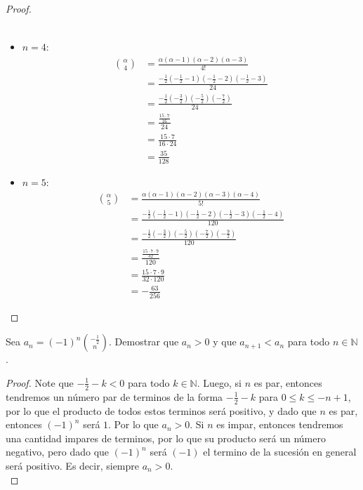 \documentclass[../main.tex]{subfiles}
\begin{document}
\begin{partes}
\begin{proof}
\begin{itemize}
\begin{align*}
            \end{align*}
            \item $n = 4$:
            \begin{align*}
                \binom{\alpha}{4} &= \frac{\alpha (\alpha-1)(\alpha-2)(\alpha-3)}{4!}\\
                &= \frac{-\frac{1}{2} \left(-\frac{1}{2}-1\right) \left(-\frac{1}{2}-2\right) \left(-\frac{1}{2}-3\right)}{24}\\
                &= \frac{-\frac{1}{2} \left(-\frac{3}{2}\right)\left(-\frac{5}{2}\right) \left(-\frac{7}{2}\right)}{24}\\
                &= \frac{\frac{15 \cdot 7}{16}}{24}\\
                &= \frac{15 \cdot 7}{16 \cdot 24}\\
                &= \frac{35}{128}
            \end{align*}
            \item $n = 5$:
            \begin{align*}
                \binom{\alpha}{5} &= \frac{\alpha (\alpha-1) (\alpha-2) (\alpha-3) (\alpha-4)}{5!}\\
                &= \frac{-\frac{1}{2} \left(-\frac{1}{2}-1\right)\left(-\frac{1}{2}-2\right)\left(-\frac{1}{2}-3\right)\left(-\frac{1}{2}-4\right)}{120}\\
                &= \frac{-\frac{1}{2} \left(-\frac{3}{2}\right)\left(-\frac{5}{2}\right)\left(-\frac{7}{2}\right)\left(-\frac{9}{2}\right)}{120}\\
                &= \frac{\frac{15 \cdot 7 \cdot 9}{32}}{120}\\
                &= \frac{15 \cdot 7 \cdot 9}{32 \cdot 120}\\
                &= -\frac{63}{256}
            \end{align*}
        \end{itemize}
    \end{proof}

    \parte Sea $a_n = (-1)^n \binom{-\frac{1}{2}}{n}$. Demostrar que $a_n > 0$ y que $a_{n+1} < a_n$ para todo $n \in \mathbb{N}$.
    \begin{proof}
        Note que $-\frac{1}{2}-k < 0$ para todo $k \in \mathbb{N}$. Luego, si $n$ es par, entonces tendremos un número par de terminos de la forma $-\frac{1}{2}-k$ para $0 \le k \le -n+1$, por lo que el producto de todos estos terminos será positivo, y dado que $n$ es par, entonces $(-1)^n$ será $1$. Por lo que $a_n > 0$. Si $n$ es impar, entonces tendremos una cantidad impares de terminos, por lo que su producto será un número negativo, pero dado que $(-1)^n$ será $(-1)$ el termino de la sucesión en general será positivo. Es decir, siempre $a_n > 0$.\\
        

\end{proof}
\end{partes}
\end{document}

